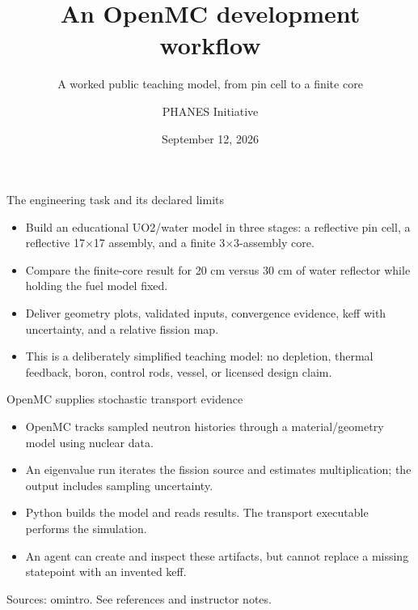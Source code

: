 \documentclass[aspectratio=169,11pt]{beamer}
\title{An OpenMC development workflow}
\subtitle{A worked public teaching model, from pin cell to a finite core}
\author{PHANES Initiative}
\institute{The University of Texas at Austin}
\date{September 12, 2026}
\begin{document}
\begin{frame}[plain]
\titlepage
\end{frame}
\begin{frame}[t,fragile]{The engineering task and its declared limits}
\fontsize{11.5}{14}\selectfont
\begin{itemize}\setlength{\itemsep}{2mm}
\item Build an educational UO2/water model in three stages: a reflective pin cell, a reflective 17$\times$17 assembly, and a finite 3$\times$3-assembly core.
\item Compare the finite-core result for 20 cm versus 30 cm of water reflector while holding the fuel model fixed.
\item Deliver geometry plots, validated inputs, convergence evidence, keff with uncertainty, and a relative fission map.
\item This is a deliberately simplified teaching model: no depletion, thermal feedback, boron, control rods, vessel, or licensed design claim.
\end{itemize}
\end{frame}
\begin{frame}[t,fragile]{OpenMC supplies stochastic transport evidence}
\fontsize{11.5}{14}\selectfont
\begin{itemize}\setlength{\itemsep}{2mm}
\item OpenMC tracks sampled neutron histories through a material/geometry model using nuclear data.
\item An eigenvalue run iterates the fission source and estimates multiplication; the output includes sampling uncertainty.
\item Python builds the model and reads results. The transport executable performs the simulation.
\item An agent can create and inspect these artifacts, but cannot replace a missing statepoint with an invented keff.
\end{itemize}
\vfill{\fontsize{6.5}{8}\selectfont\color{UTgray} Sources: omintro. See references and instructor notes.\par}
\end{frame}
\end{document}
